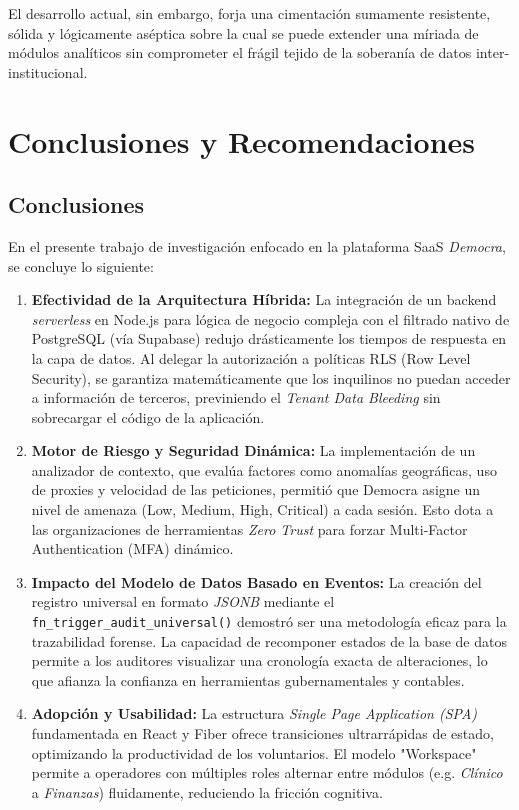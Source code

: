 \documentclass[11pt,a4paper,oneside]{report}
\begin{document}
El desarrollo actual, sin embargo, forja una cimentaci\'on sumamente resistente, s\'olida y l\'ogicamente as\'eptica sobre la cual se puede extender una m\'iriada de m\'odulos anal\'iticos sin comprometer el fr\'agil tejido de la soberan\'ia de datos inter-institucional.

\chapter{Conclusiones y Recomendaciones}

\section{Conclusiones}
En el presente trabajo de investigaci\'on enfocado en la plataforma SaaS \textit{Democra}, se concluye lo siguiente:

\begin{enumerate}
    \item \textbf{Efectividad de la Arquitectura H\'ibrida:} La integraci\'on de un backend \textit{serverless} en Node.js para l\'ogica de negocio compleja con el filtrado nativo de PostgreSQL (v\'ia Supabase) redujo dr\'asticamente los tiempos de respuesta en la capa de datos. Al delegar la autorizaci\'on a pol\'iticas RLS (Row Level Security), se garantiza matem\'aticamente que los inquilinos no puedan acceder a informaci\'on de terceros, previniendo el \textit{Tenant Data Bleeding} sin sobrecargar el c\'odigo de la aplicaci\'on.
    \item \textbf{Motor de Riesgo y Seguridad Din\'amica:} La implementaci\'on de un analizador de contexto, que eval\'ua factores como anomal\'ias geogr\'aficas, uso de proxies y velocidad de las peticiones, permiti\'o que Democra asigne un nivel de amenaza (Low, Medium, High, Critical) a cada sesi\'on. Esto dota a las organizaciones de herramientas \textit{Zero Trust} para forzar Multi-Factor Authentication (MFA) din\'amico.
    \item \textbf{Impacto del Modelo de Datos Basado en Eventos:} La creaci\'on del registro universal en formato \textit{JSONB} mediante el \texttt{fn\_trigger\_audit\_universal()} demostr\'o ser una metodolog\'ia eficaz para la trazabilidad forense. La capacidad de recomponer estados de la base de datos permite a los auditores visualizar una cronolog\'ia exacta de alteraciones, lo que afianza la confianza en herramientas gubernamentales y contables.
    \item \textbf{Adopci\'on y Usabilidad:} La estructura \textit{Single Page Application (SPA)} fundamentada en React y Fiber ofrece transiciones ultrarr\'apidas de estado, optimizando la productividad de los voluntarios. El modelo "Workspace" permite a operadores con m\'ultiples roles alternar entre m\'odulos (e.g. \textit{Cl\'inico} a \textit{Finanzas}) fluidamente, reduciendo la fricci\'on cognitiva.
\end{enumerate}
\end{document}
